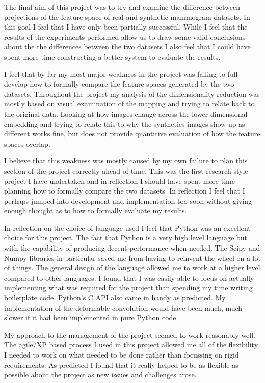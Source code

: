 The final aim of this project was to try and examine the difference between projections of the feature space of real and synthetic mammogram datasets. In this goal I feel that I have only been partially successful. While I feel that the results of the experiments performed allow us to draw some valid conclusions about the the differences between the two datasets I also feel that I could have spent more time constructing a better system to evaluate the results.

I feel that by far my most major weakness in the project was failing to full develop how to formally compare the feature spaces generated by the two datasets. Throughout the project my analysis of the dimensionality reduction was mostly based on visual examination of the mapping and trying to relate back to the original data. Looking at how images change across the lower dimensional embedding and trying to relate this to why the synthetics images show up as different works fine, but does not provide quantitive evaluation of how the feature spaces overlap.

I believe that this weakness was mostly caused by my own failure to plan this section of the project correctly ahead of time. This was the first research style project I have undertaken and in reflection I should have spent more time planning how to formally compare the two datasets. In reflection I feel that I perhaps jumped into development and implementation too soon without giving enough thought as to how to formally evaluate my results. 

In reflection on the choice of language used I feel that Python was an excellent choice for this project. The fact that Python is a very high level language but with the capability of producing decent performance when needed. The Scipy and Numpy libraries in particular saved me from having to reinvent the wheel on a lot of things. The general design of the language allowed me to work at a higher level compared to other languages. I found that I was easily able to focus on actually implementing what was required for the project than spending my time writing boilerplate code. Python's C API also came in handy as predicted. My implementation of the deformable convolution would have been much, much slower if it had been implemented in pure Python code.

My approach to the management of the project seemed to work reasonably well. The agile/XP based process I used in this project allowed me all of the flexibility I needed to work on what needed to be done rather than focussing on rigid requirements. As predicted I found that it really helped to be as flexible as possible about the project as new issues and challenges arose.

